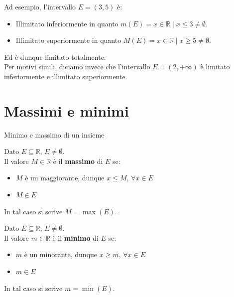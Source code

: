 \documentclass[12pt]{report}
\newcommand{\R}{\mathbb{R}}
\begin{document}
	Ad esempio, l'intervallo $E = (3, 5)$ è:
	\begin{itemize}
		
		\item Illimitato inferiormente in quanto $m(E) = {x \in \R \mid x \leq 3} \neq \emptyset$.
		
		\item Illimitato superiormente in quanto $M(E) = {x \in \R \mid x \geq 5} \neq \emptyset$.
		
	\end{itemize}
	
	Ed è dunque limitato totalmente.\\
	Per motivi simili, diciamo invece che l'intervallo $E = (2, +\infty)$ è limitato inferiormente e illimitato superiormente.
	
	\section{Massimi e minimi}
	\begin{definizione}{Minimo e massimo di un insieme}{}
		
		Dato $E \subseteq \R,\, E \neq \emptyset$.\\
		Il valore $M \in \R$ è il \textbf{massimo} di $E$ se:
		\begin{itemize}
			
			\item $M$ è un maggiorante, dunque $x \leq M,\,\forall x\in E$
			
			\item $M \in E$
			
		\end{itemize}
		In tal caso si scrive $M = \max(E)$.
		\smallbreak
		
		Dato $E \subseteq \R,\, E \neq \emptyset$.\\
		Il valore $m \in \R$ è il \textbf{minimo} di $E$ se:
		\begin{itemize}
			
			\item $m$ è un minorante, dunque $x \geq m,\,\forall x\in E$
			
			\item $m \in E$
			
		\end{itemize}
		In tal caso si scrive $m = \min(E)$.

	\end{definizione}
	
\end{document}
